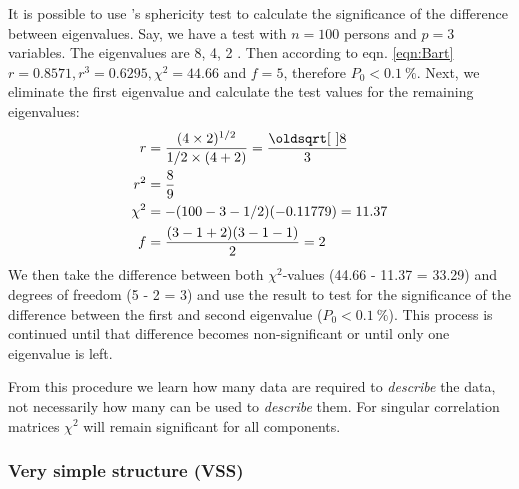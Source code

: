 It is possible to use 's sphericity test to calculate the significance of the difference between eigenvalues. Say, we have a test with \(n = 100 \) persons and \(p = 3 \) variables. The eigenvalues are 8, 4, 2 \parencite{Hop-75}. Then according to eqn. \ref{eqn:Bart} \(r = 0.8571, r^3 = 0.6295, \chi^2 = 44.66 \) and \(f = 5 \), therefore \(P_0 < \SI{0.1}{\%} \). Next, we eliminate the first eigenvalue and calculate the test values for the remaining eigenvalues:
\begin{align}\label{eqn:BartNo}
   r      &= \frac{(4 \times 2)^{1/2}}{1/2 \times (4 + 2)} = \frac{\sqrt{8}}{3} \\
   r^2    &= \frac{8}{9} \notag \\
   \chi^2 &= -(100 - 3 - 1/2) (-0.11779) = 11.37 \notag \\
   f      &= \frac{(3 - 1 + 2) (3 - 1 -1)}{2} = 2 \notag
\end{align}
We then take the difference between both \(\chi^2 \)-values (44.66 - 11.37 = 33.29) and degrees of freedom (5 - 2 = 3) and use the result to test for the significance of the difference between the first and second eigenvalue (\( P_0 < \SI{0.1}{\%} \)). This process is continued until that difference becomes non-significant or until only one eigenvalue is left.

From this procedure we learn how many data are required to \emph{describe} the data, not necessarily how many can be used to \emph{describe} them. For singular correlation matrices \(\chi^2 \) will remain significant for all  components.

\subsubsection{Very simple structure (VSS)}

